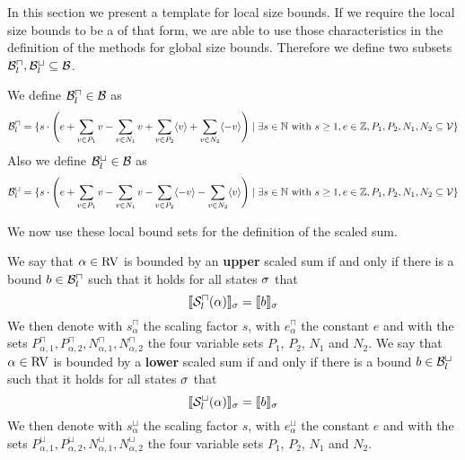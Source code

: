 In this section we present a template for local size bounds.
If we require the local size bounds to be a of that form, we are able to use those characteristics in the definition of the methods for global size bounds.
Therefore we define two subsets $\mathcal{B}^\sqcap_l, \mathcal{B}^\sqcup_l \subseteq \mathcal{B}$.

\begin{definition}
  We define $\mathcal{B}^\sqcap_l \in \mathcal{B}$ as 
  \[ \mathcal{B}^\sqcap_l = \lbrace 
    s \cdot \left(
        e
      + \sum_{v \in P_1} v
      - \sum_{v \in N_1} v
      + \sum_{v \in P_2} \langle v\rangle
      + \sum_{v \in N_2} \langle-v\rangle
      \right) \mid \exists s \in \mathbb{N} \text{ with } s \geq 1, e \in \mathbb{Z}, P_1, P_2, N_1, N_2 \subseteq \mathcal{V}  \rbrace\]
  Also we define $\mathcal{B}^\sqcup_l \in \mathcal{B}$ as 
  \[ \mathcal{B}^\sqcup_l = \lbrace 
    s \cdot \left(
        e
      + \sum_{v \in P_1} v
      - \sum_{v \in N_1} v
      - \sum_{v \in P_2} \langle-v\rangle
      - \sum_{v \in N_2} \langle v\rangle
      \right) \mid \exists s \in \mathbb{N} \text{ with } s \geq 1, e \in \mathbb{Z}, P_1, P_2, N_1, N_2 \subseteq \mathcal{V}  \rbrace\]
\end{definition}

We now use these local bound sets for the definition of the scaled sum.

\begin{definition}
  We say that $\alpha \in \text{RV}$ is bounded by an \textbf{upper} scaled sum if and only if there is a bound $b \in \mathcal{B}^\sqcap_l$ such that it holds for all states $\sigma$ that
  \[ \llbracket {\mathcal{S}^\sqcap_l}(\alpha) \rrbracket_{\sigma} = \llbracket b \rrbracket_{\sigma} \]
  We then denote with $s^\sqcap_\alpha$ the scaling factor $s$, with $e^\sqcap_\alpha$ the constant $e$ and with the sets $P_{\alpha,1}^\sqcap, P_{\alpha,2}^\sqcap, N_{\alpha,1}^\sqcap, N_{\alpha,2}^\sqcap$ the four variable sets $P_1$, $P_2$, $N_1$ and $N_2$.
  We say that $\alpha \in \text{RV}$ is bounded by a \textbf{lower} scaled sum if and only if there is a bound $b \in \mathcal{B}^\sqcup_l$ such that it holds for all states $\sigma$ that
  \[ \llbracket {\mathcal{S}^\sqcup_l}(\alpha) \rrbracket_{\sigma} = \llbracket b \rrbracket_{\sigma} \]
  We then denote with $s^\sqcup_\alpha$ the scaling factor $s$, with $e^\sqcup_\alpha$ the constant $e$ and with the sets $P_{\alpha,1}^\sqcup, P_{\alpha,2}^\sqcup, N_{\alpha,1}^\sqcup, N_{\alpha,2}^\sqcup$ the four variable sets $P_1$, $P_2$, $N_1$ and $N_2$.
\end{definition}


